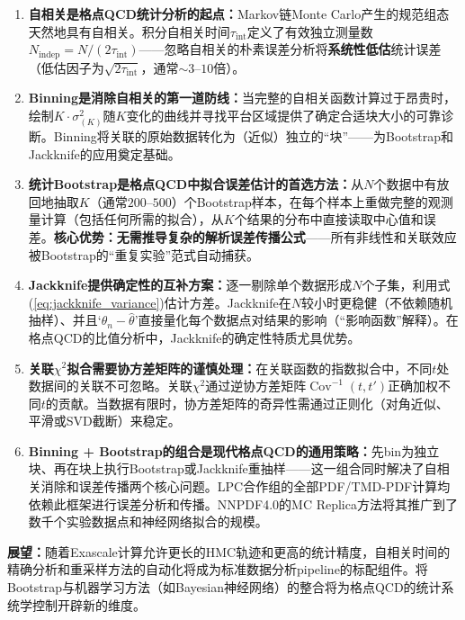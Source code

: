 \documentclass[12pt,a4paper]{ctexart}
\theoremstyle{definition}
\begin{document}
\begin{enumerate}[leftmargin=*]
    \item \textbf{自相关是格点QCD统计分析的起点：}Markov链Monte Carlo产生的规范组态天然地具有自相关。积分自相关时间$\tau_{\text{int}}$定义了有效独立测量数$N_{\text{indep}} = N/(2\tau_{\text{int}})$——忽略自相关的朴素误差分析将\textbf{系统性低估}统计误差（低估因子为$\sqrt{2\tau_{\text{int}}}$，通常$\sim 3\text{--}10$倍）。

    \item \textbf{Binning是消除自相关的第一道防线：}当完整的自相关函数计算过于昂贵时，绘制$K \cdot \sigma^2_{(K)}$随$K$变化的曲线并寻找平台区域提供了确定合适块大小的可靠诊断。Binning将关联的原始数据转化为（近似）独立的``块''——为Bootstrap和Jackknife的应用奠定基础。

    \item \textbf{统计Bootstrap是格点QCD中拟合误差估计的首选方法：}从$N$个数据中有放回地抽取$K$（通常$200\text{--}500$）个Bootstrap样本，在每个样本上重做完整的观测量计算（包括任何所需的拟合），从$K$个结果的分布中直接读取中心值和误差。\textbf{核心优势：无需推导复杂的解析误差传播公式}——所有非线性和关联效应被Bootstrap的``重复实验''范式自动捕获。

    \item \textbf{Jackknife提供确定性的互补方案：}逐一剔除单个数据形成$N$个子集，利用式(\ref{eq:jackknife_variance})估计方差。Jackknife在$N$较小时更稳健（不依赖随机抽样）、并且`$\theta_n - \hat\theta$'直接量化每个数据点对结果的影响（``影响函数''解释）。在格点QCD的比值分析中，Jackknife的确定性特质尤具优势。

    \item \textbf{关联$\chi^2$拟合需要协方差矩阵的谨慎处理：}在关联函数的指数拟合中，不同$t$处数据间的关联不可忽略。关联$\chi^2$通过逆协方差矩阵$\operatorname{Cov}^{-1}(t,t')$正确加权不同$t$的贡献。当数据有限时，协方差矩阵的奇异性需通过正则化（对角近似、平滑或SVD截断）来稳定。

    \item \textbf{Binning + Bootstrap的组合是现代格点QCD的通用策略：}先bin为独立块、再在块上执行Bootstrap或Jackknife重抽样——这一组合同时解决了自相关消除和误差传播两个核心问题。LPC合作组的全部PDF/TMD-PDF计算均依赖此框架进行误差分析和传播。NNPDF4.0的MC Replica方法将其推广到了数千个实验数据点和神经网络拟合的规模。
\end{enumerate}

\textbf{展望：}随着Exascale计算允许更长的HMC轨迹和更高的统计精度，自相关时间的精确分析和重采样方法的自动化将成为标准数据分析pipeline的标配组件。将Bootstrap与机器学习方法（如Bayesian神经网络）的整合将为格点QCD的统计系统学控制开辟新的维度。
\end{document}
